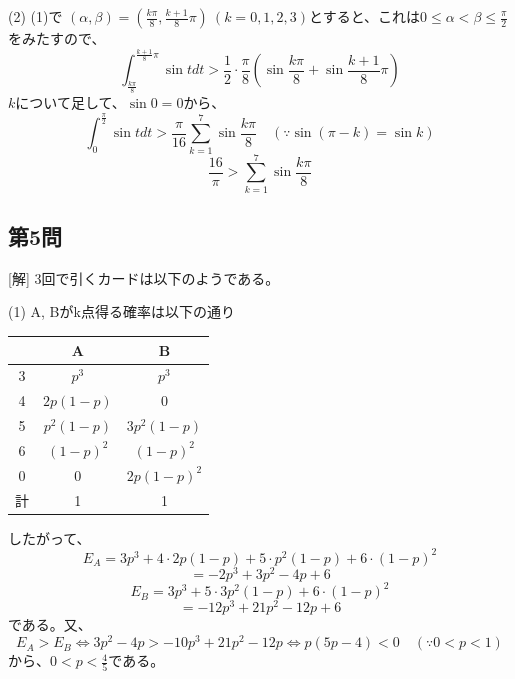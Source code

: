 \documentclass[../main.tex]{subfiles}
\begin{document}
(2) (1)で $(\alpha, \beta) = \left( \frac{k\pi}{8}, \frac{k+1}{8}\pi \right) \ (k=0,1,2,3)$とすると、これは$0 \le \alpha < \beta \le \frac{\pi}{2}$をみたすので、
$$
\int_{\frac{k\pi}{8}}^{\frac{k+1}{8}\pi} \sin t dt > \frac{1}{2} \cdot \frac{\pi}{8} \left( \sin\frac{k\pi}{8} + \sin\frac{k+1}{8}\pi \right)
$$
$k$について足して、$\sin 0 = 0$から、
$$
\int_0^{\frac{\pi}{2}} \sin t dt > \frac{\pi}{16} \sum_{k=1}^7 \sin\frac{k\pi}{8} \quad (\because \sin(\pi-k) = \sin k)
$$
$$
\frac{16}{\pi} > \sum_{k=1}^7 \sin\frac{k\pi}{8}
$$

\subsection*{第5問}
[解] 3回で引くカードは以下のようである。
\begin{center}
\end{center}
(1) A, Bがk点得る確率は以下の通り
\begin{center}
  \begin{tabular}{|c|c|c|}
    \hline
    & A & B \\ \hline
    3 & $p^3$ & $p^3$ \\ \hline
    4 & $2p(1-p)$ & 0 \\ \hline
    5 & $p^2(1-p)$ & $3p^2(1-p)$ \\ \hline
    6 & $(1-p)^2$ & $(1-p)^2$ \\ \hline
    0 & 0 & $2p(1-p)^2$ \\ \hline
    計 & 1 & 1 \\ \hline
  \end{tabular}
\end{center}
したがって、
$$
E_A = 3p^3 + 4 \cdot 2p(1-p) + 5 \cdot p^2(1-p) + 6 \cdot (1-p)^2
$$
$$
= -2p^3 + 3p^2 - 4p + 6
$$
$$
E_B = 3p^3 + 5 \cdot 3p^2(1-p) + 6 \cdot (1-p)^2
$$
$$
= -12p^3 + 21p^2 - 12p + 6
$$
である。又、
$$
E_A > E_B \Leftrightarrow 3p^2 - 4p > -10p^3 + 21p^2 - 12p \Leftrightarrow p(5p-4) < 0 \quad (\because 0 < p < 1)
$$
から、$0 < p < \frac{4}{5}$である。
\end{document}
